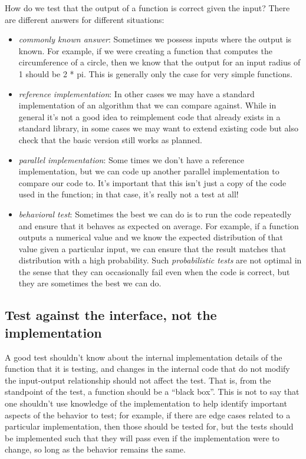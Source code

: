How do we test that the output of a function is correct given the input? There are different answers for different situations:

\begin{itemize}
\item \textit{commonly known answer}: Sometimes we possess inputs where the output is known.  For example, if we were creating a function that computes the circumference of a circle, then we know that the output for an input radius of 1 should be 2 * pi.  This is generally only the case for very simple functions.
\item \textit{reference implementation}: In other cases we may have a standard implementation of an algorithm that we can compare against.  While in general it's not a good idea to reimplement code that already exists in a standard library, in some cases we may want to extend existing code but also check that the basic version still works as planned.
\item \textit{parallel implementation}: Some times we don't have a reference implementation, but we can code up another parallel implementation to compare our code to.  It's important that this isn't just a copy of the code used in the function; in that case, it's really not a test at all!
\item \textit{behavioral test}: Sometimes the best we can do is to run the code repeatedly and ensure that it behaves as expected on average.  For example, if a function outputs a numerical value and we know the expected distribution of that value given a particular input, we can ensure that the result matches that distribution with a high probability.  Such \textit{probabilistic tests} are not optimal in the sense that they can occasionally fail even when the code is correct, but they are sometimes the best we can do.
\end{itemize}

\subsection{Test against the interface, not the implementation}

A good test shouldn't know about the internal implementation details of the function that it is testing, and changes in the internal code that do not modify the input-output relationship should not affect the test.
That is, from the standpoint of the test, a function should be a ``black box''. 
This is not to say that one shouldn't use knowledge of the implementation to help identify important aspects of the behavior to test; for example, if there are edge cases related to a particular implementation, then those should be tested for, but the tests should be implemented such that they will pass even if the implementation were to change, so long as the behavior remains the same.

